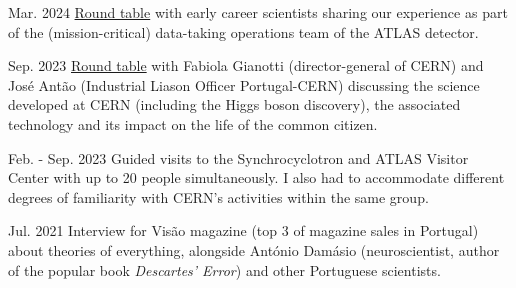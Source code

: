 
\begin{cventries}
    
    {}{Mar. 2024}
    {\href{https://indico.cern.ch/event/1378416/overview}{Round table} with early career scientists sharing our experience as part of the (mission-critical) data-taking operations team of the ATLAS detector.}



    {}{Sep. 2023}
    {\href{https://www.cienciaviva.pt/divulgacao-cientifica/o-bosao-de-higgs-e-as-nossas-vidas}{Round table} with Fabiola Gianotti (director-general of CERN) and José Antão (Industrial Liason Officer Portugal-CERN) discussing the science developed at CERN (including the Higgs boson discovery), the associated technology and its impact on the life of the common citizen.}

    {}{Feb. - Sep. 2023}
    {Guided visits to the Synchrocyclotron and ATLAS Visitor Center with up to 20 people simultaneously. I also had to accommodate different degrees of familiarity with CERN's activities within the same group.}

    {}{Jul. 2021}
    {Interview for Visão magazine (top 3 of magazine sales in Portugal) about theories of everything, alongside António Damásio (neuroscientist, author of the popular book \textit{Descartes' Error}) and other Portuguese scientists.}




\end{cventries}
